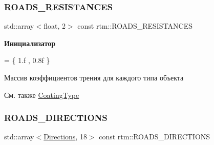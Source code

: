 \subsubsection{\texorpdfstring{R\+O\+A\+D\+S\+\_\+\+R\+E\+S\+I\+S\+T\+A\+N\+C\+ES}{ROADS\_RESISTANCES}}
{\footnotesize\ttfamily std\+::array$<$float, 2$>$ const rtm\+::\+R\+O\+A\+D\+S\+\_\+\+R\+E\+S\+I\+S\+T\+A\+N\+C\+ES}

{\bfseries Инициализатор}
\begin{DoxyCode}
= \{
        1.f   
        , 0.8f   
    \}
\end{DoxyCode}
Массив коэффициентов трения для каждого типа объекта \begin{DoxySeeAlso}{См. также}
\hyperlink{namespacertm_aecd3929e64cd461eb3555b611f6fad95}{Coating\+Type} 
\end{DoxySeeAlso}
\mbox{\label{namespacertm_a5820286728bf347e0320bdd9dc91ed1b}} 
\subsubsection{\texorpdfstring{R\+O\+A\+D\+S\+\_\+\+D\+I\+R\+E\+C\+T\+I\+O\+NS}{ROADS\_DIRECTIONS}}
{\footnotesize\ttfamily std\+::array$<$\hyperlink{namespacertm_a4776fbfe59834ff1a16838ad6735b69a}{Directions}, 18$>$ const rtm\+::\+R\+O\+A\+D\+S\+\_\+\+D\+I\+R\+E\+C\+T\+I\+O\+NS}

